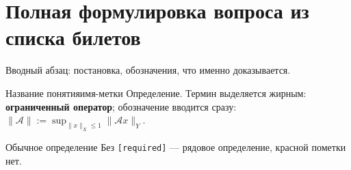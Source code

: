 %
%

\section{Полная формулировка вопроса из списка билетов}

Вводный абзац: постановка, обозначения, что именно доказывается.

\begin{Definition}[required]{Название понятия}{имя-метки}
	Определение. Термин выделяется жирным: \textbf{ограниченный оператор};
	обозначение вводится сразу: $\|\mathcal{A}\| := \sup_{\|x\|_X \le 1}\|\mathcal{A}x\|_Y$.
\end{Definition}

\begin{Definition}{Обычное определение}{}
	Без \verb|[required]| — рядовое определение, красной пометки нет.
\end{Definition}

